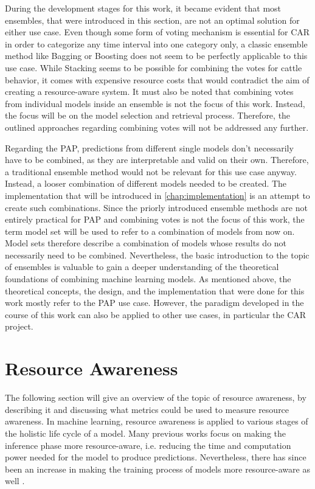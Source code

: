 During the development stages for this work, it became evident that most ensembles, that were introduced in this section, are not an optimal solution for either use case. Even though some form of voting mechanism is essential for CAR in order to categorize any time interval into one category only, a classic ensemble method like Bagging or Boosting does not seem to be perfectly applicable to this use case. While Stacking seems to be possible for combining the votes for cattle behavior, it comes with expensive resource costs that would contradict the aim of creating a resource-aware system. It must also be noted that combining votes from individual models inside an ensemble is not the focus of this work. Instead, the focus will be on the model selection and retrieval process. Therefore, the outlined approaches regarding combining votes will not be addressed any further. 

Regarding the PAP, predictions from different single models don’t necessarily have to be combined, as they are interpretable and valid on their own. Therefore, a traditional ensemble method would not be relevant for this use case anyway. Instead, a looser combination of different models needed to be created. The implementation that will be introduced in \autoref{chap:implementation} is an attempt to create such combinations. Since the priorly introduced ensemble methods are not entirely practical for PAP and combining votes is not the focus of this work, the term model set will be used to refer to a combination of models from now on. Model sets therefore describe a combination of models whose results do not necessarily need to be combined. Nevertheless, the basic introduction to the topic of ensembles is valuable to gain a deeper understanding of the theoretical foundations of combining machine learning models. As mentioned above, the theoretical concepts, the design, and the implementation that were done for this work mostly refer to the PAP use case. However, the paradigm developed in the course of this work can also be applied to other use cases, in particular the CAR project. 


\section{Resource Awareness}

The following section will give an overview of the topic of resource awareness, by describing it and discussing what metrics could be used to measure resource awareness. In machine learning, resource awareness is applied to various stages of the holistic life cycle of a model. Many previous works \cite{amir2018,tann2016,yu2018} focus on making the inference phase more resource-aware, i.e. reducing the time and computation power needed for the model to produce predictions. Nevertheless, there has since been an increase in making the training process of models more resource-aware as well \cite{rapp2022}.

